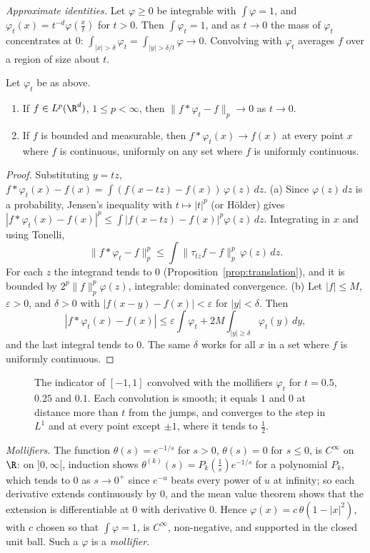 \emph{Approximate identities.} Let $\varphi\ge0$ be integrable with $\int\varphi=1$, and $\varphi_t(x)=t^{-d}\varphi(\frac xt)$ for $t>0$. Then $\int\varphi_t=1$, and as $t\to0$ the mass of $\varphi_t$ concentrates at $0$:
$\int_{|x|>\delta}\varphi_t=\int_{|y|>\delta/t}\varphi\to0$. Convolving with $\varphi_t$ averages $f$ over a region of size about $t$.

\begin{theorem}\label{thm:approxid}
Let $\varphi_t$ be as above.
\begin{enumerate}[label=(\alph*)]
\item If $f\in L^p(\R^d)$, $1\le p<\infty$, then $\|f*\varphi_t-f\|_p\to0$ as $t\to0$.
\item If $f$ is bounded and measurable, then $f*\varphi_t(x)\to f(x)$ at every point $x$ where $f$ is continuous, uniformly on any set where $f$ is uniformly continuous.
\end{enumerate}
\end{theorem}
\begin{proof}
Substituting $y=tz$, $f*\varphi_t(x)-f(x)=\int(f(x-tz)-f(x))\,\varphi(z)\,dz$.
(a) Since $\varphi(z)\,dz$ is a probability, Jensen's inequality with $t\mapsto|t|^p$ (or H\"older) gives $|f*\varphi_t(x)-f(x)|^p\le\int|f(x-tz)-f(x)|^p\varphi(z)\,dz$. Integrating in $x$ and using Tonelli,
\[\|f*\varphi_t-f\|_p^p\le\int\|\tau_{tz}f-f\|_p^p\,\varphi(z)\,dz.\]
For each $z$ the integrand tends to $0$ (Proposition~\ref{prop:translation}), and it is bounded by $2^p\|f\|_p^p\varphi(z)$, integrable: dominated convergence.
(b) Let $|f|\le M$, $\varepsilon>0$, and $\delta>0$ with $|f(x-y)-f(x)|<\varepsilon$ for $|y|<\delta$. Then
\[|f*\varphi_t(x)-f(x)|\le\varepsilon\int\varphi_t+2M\int_{|y|\ge\delta}\varphi_t(y)\,dy,\]
and the last integral tends to $0$. The same $\delta$ works for all $x$ in a set where $f$ is uniformly continuous.
\end{proof}

\begin{figure}[ht]
\centering
{}
\caption{The indicator of $[-1,1]$ convolved with the mollifiers $\varphi_t$ for $t=0.5$, $0.25$ and $0.1$. Each convolution is smooth; it equals $1$ and $0$ at distance more than $t$ from the
jumps, and converges to the step in $L^1$ and at every point except $\pm1$, where it tends to $\frac12$.}
\label{fig:mollify}
\end{figure}

\emph{Mollifiers.} The function $\theta(s)=e^{-1/s}$ for $s>0$, $\theta(s)=0$ for $s\le0$, is $C^\infty$ on $\R$: on $]0,\infty[$, induction shows $\theta^{(k)}(s)=P_k(\frac1s)e^{-1/s}$ for a polynomial $P_k$, which tends to $0$
as $s\to0^+$ since $e^{-u}$ beats every power of $u$ at infinity; so each derivative extends continuously by $0$, and the mean value theorem shows that the extension is differentiable at $0$
with derivative $0$. Hence $\varphi(x)=c\,\theta(1-|x|^2)$, with $c$ chosen so that $\int\varphi=1$, is $C^\infty$, non-negative, and supported in the closed unit ball. Such a $\varphi$ is a \emph{mollifier}.

